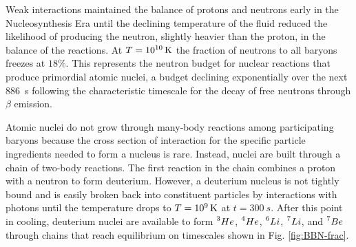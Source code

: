 \documentclass{paper}
\begin{document}
  Weak interactions maintained the balance of protons and neutrons early in
  the Nucleosynthesis Era until the declining temperature of the fluid reduced 
  the likelihood of producing the neutron, slightly heavier than the proton, 
  in the balance of the reactions. At \(T = \SI{E10}{K}\) the fraction of 
  neutrons to all baryons freezes at \(18\%\). This represents the neutron 
  budget for nuclear reactions that produce primordial atomic nuclei, a budget
  declining exponentially over the next \SI{886}{s} following the 
  characteristic timescale for the decay of free neutrons through \(\beta\)
  emission.

  Atomic nuclei do not grow through many-body reactions among participating
  baryons because the cross section of interaction for the specific particle
  ingredients needed to form a nucleus is rare. Instead, nuclei are built
  through a chain of two-body reactions. The first reaction in the chain
  combines a proton with a neutron to form deuterium. However, a deuterium
  nucleus is not tightly bound and is easily broken back into constituent
  particles by interactions with photons until the temperature drops to 
  \(T = \SI{E9}{K}\) at \(t = \SI{300}{s}\). After this point in cooling, 
  deuterium nuclei are available to form \(\prescript{3}{}{He}\), 
  \(\prescript{4}{}{He}\), \(\prescript{6}{}{Li}\), \(\prescript{7}{}{Li}\), 
  and \(\prescript{7}{}{Be}\) through chains that reach equilibrium on
  timescales shown in Fig. \ref{fig:BBN-frac}.
\end{document}
